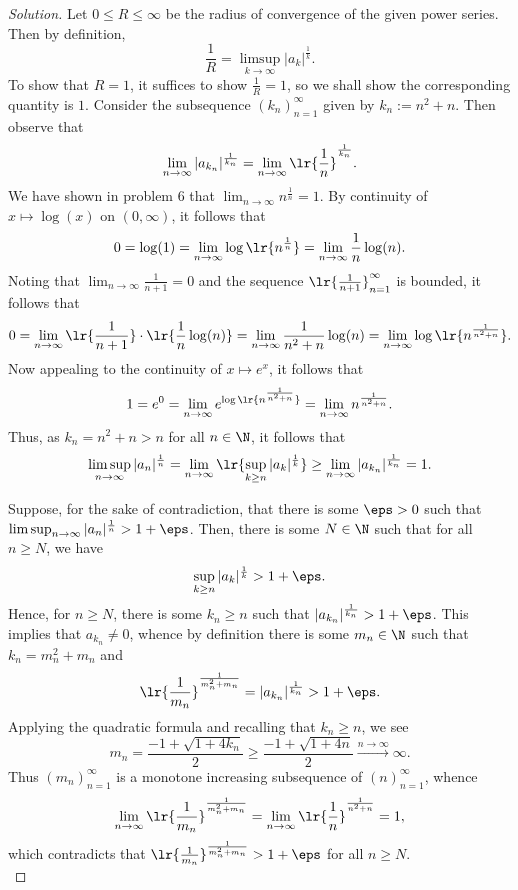 \documentclass[12pt]{article}
\begin{document}
\begin{homeworkProblem}
\begin{proof}[Solution]
  Let $ 0\leq R \leq \infty $ be the radius of convergence of the given power series. Then by definition,
  \[
    \frac{1}{R} = \limsup_{k\to \infty}|a_{k}|^{\frac{1}{k}}.
  \]
  To show that $ R=1 $, it suffices to show $ \frac{1}{R} = 1 $, so we shall show the corresponding quantity is $ 1 $. Consider the subsequence $ (k_{n})_{n=1}^{\infty} $ given by $ k_{n}:= n^{2}+n $. Then observe that
  \begin{align*}
    \lim_{n\to\infty} |a_{k_{n}}|^{\frac{1}{k_{n}}} = \lim_{n\to \infty} \lr{\frac{1}{n}}^{\frac{1}{k_{n}}}.
  \end{align*}
  We have shown in problem 6 that $ \lim_{n\to \infty}n^{\frac{1}{n}} = 1 $. By continuity of $ x\mapsto \log(x) $ on $ (0,\infty) $, it follows that 
  \[
    0 = \log(1) = \lim_{n\to\infty} \log\lr{n^{\frac{1}{n}}} = \lim_{n\to\infty} \frac{1}{n} \log(n).
  \]
  Noting that $ \lim_{n\to\infty} \frac{1}{n+1} = 0 $ and the sequence $ \lr{\frac{1}{n+1}}_{n=1}^{\infty} $ is bounded, it follows that 
  \begin{align*}
    0 = \lim_{n\to\infty}\lr{\frac{1}{n+1}}\cdot\lr{\frac{1}{n}\log(n)} = \lim_{n\to\infty} \frac{1}{n^{2}+n} \log(n) = \lim_{n\to\infty} \log\lr{n^{\frac{1}{n^{2}+n}}}.
  \end{align*}
  Now appealing to the continuity of $x\mapsto e^{x} $, it follows that 
  \[
    1 = e^{0} = \lim_{n\to\infty} e^{\log\lr{n^{\frac{1}{n^{2}+n}}}} = \lim_{n\to\infty} n^{\frac{1}{n^{2}+n}}.
  \]
  Thus, as $ k_{n}=n^{2}+n > n $ for all $ n\in\N $, it follows that
  \begin{align*}
    \limsup_{n\to\infty}|a_{n}|^{\frac{1}{n}} = \lim_{n\to\infty} \lr{\sup_{k\geq n} |a_{k}|^{\frac{1}{k}} }\geq \lim_{n\to\infty} |a_{k_{n}}|^{\frac{1}{k_{n}}} = 1.
  \end{align*}

  Suppose, for the sake of contradiction, that there is some $ \eps>0 $ such that $ \limsup_{n\to\infty} |a_{n}|^{\frac{1}{n}} > 1+\eps $. Then, there is some $ N\in \N $ such that for all $ n\geq N $, we have 
  \[
    \sup_{k\geq n} |a_{k}|^{\frac{1}{k}} > 1+\eps.
  \]
  Hence, for $ n\geq N $, there is some $ k_{n} \geq n $ such that $ |a_{k_{n}}|^{\frac{1}{k_{n}}} > 1+\eps $. This implies that $ a_{k_{n}}\neq 0 $, whence by definition there is some $ m_{n}\in \N $ such that $ k_{n} = m_{n}^{2}+m_{n} $ and 
  \[
    \lr{\frac{1}{m_{n}}}^{\frac{1}{m_{n}^{2}+ m_{n}}}=|a_{k_{n}}|^{\frac{1}{k_{n}}}  > 1+\eps.
  \]
  Applying the quadratic formula and recalling that $ k_{n}\geq n $, we see
  \[
    m_{n} = \frac{-1+ \sqrt{1+4k_{n}}}{2} \geq \frac{-1+ \sqrt{1+4n}}{2} \xrightarrow{n\to\infty} \infty.
  \]
  Thus $ (m_{n})_{n=1}^{\infty} $ is a monotone increasing subsequence of $ (n)_{n=1}^{\infty} $, whence 
  \[
    \lim_{n\to\infty} \lr{\frac{1}{m_{n}}}^{\frac{1}{m_{n}^{2}+ m_{n}}} = \lim_{n\to\infty} \lr{\frac{1}{n}}^{\frac{1}{n^{2}+n}} = 1,
  \]
  which contradicts that $  \lr{\frac{1}{m_{n}}}^{\frac{1}{m_{n}^{2}+ m_{n}}} > 1+\eps$ for all $ n\geq N $.\\
  

\end{proof}
\end{homeworkProblem}
\end{document}
